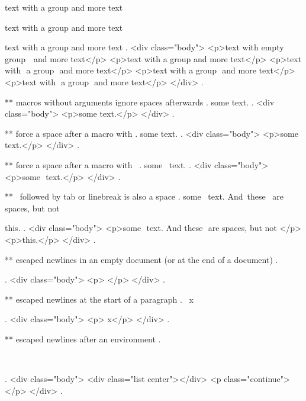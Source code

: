 text with { a group } and more text

text with { a group  } and more text

text with {  a group  }  and more text
.
<div class="body">
<p>text with empty group ​ ​ and more text</p>
<p>text with a group​ and more text</p>
<p>text with ​ a group ​ and more text</p>
<p>text with ​ a group ​ and more text</p>
<p>text with ​ a group ​ and more text</p>
</div>
.


** macros without arguments ignore spaces afterwards
.
some \empty  text.
.
<div class="body">
<p>some text.</p>
</div>
.


** force a space after a macro with {}
.
some \empty{} text.
.
<div class="body">
<p>some ​ text.</p>
</div>
.


** force a space after a macro with \
.
some \empty\ text.
.
<div class="body">
<p>some ​ text.</p>
</div>
.


** \ followed by tab or linebreak is also a space
.
some \empty\
text. And\	these
\
are spaces, but not\

this.
.
<div class="body">
<p>some ​ text. And​ these ​ are spaces, but not​ </p>
<p>this.</p>
</div>
.


** escaped newlines in an empty document (or at the end of a document)
.
\


.
<div class="body">
<p>​ </p>
</div>
.


** escaped newlines at the start of a paragraph
.
\
x

.
<div class="body">
<p>​ x</p>
</div>
.


** escaped newlines after an environment
.
\begin{center}
\end{center}
\

.
<div class="body">
<div class="list center"></div>
<p class="continue">​ </p>
</div>
.
